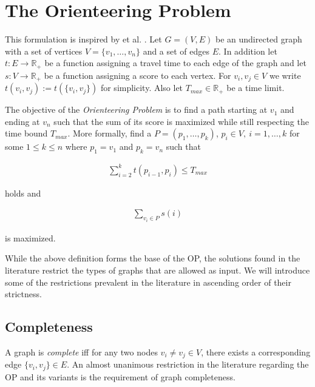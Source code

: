 \section{The Orienteering Problem} %
\label{sec:02:problem}

This formulation is inspired by \citeauthor{vansteenwegen_orienteering_2011} et al. \cite{vansteenwegen_orienteering_2011}.
Let $G=(V,E)$ be an undirected graph with a set of vertices $V = \{v_1, \dots, v_n\}$ and a set of edges $E$.
In addition let $t: E \rightarrow \mathbb{R}_+$ be a function assigning a travel time to each edge of the graph and let
$s: V \rightarrow \mathbb{R}_+$ be a function assigning a score to each vertex.
For $v_i, v_j \in V$ we write $t(v_i, v_j) := t(\{v_i, v_j\})$ for simplicity.
Also let $T_{max} \in \mathbb{R}_+$ be a time limit.

The objective of the \emph{Orienteering Problem} is to find a path starting at $v_1$ and ending at $v_n$ 
such that the sum of its score is maximized while still respecting the time bound $T_{max}$.
More formally, find a $P = (p_1, \dots, p_k)$, $p_i \in V,\ i=1,\dots, k$ for some $1 \leq k \leq n$ where $p_1 = v_1$ and $p_k = v_n$ such that

\begin{align*}
  \sum_{i = 2}^k t(p_{i-1}, p_i) \leq T_{max}
\end{align*}

holds and

\begin{align*}
  \sum_{v_i \in P} s(i)
\end{align*}

is maximized.


While the above definition forms the base of the OP, the solutions found in the literature restrict the types of graphs that are allowed as input.
We will introduce some of the restrictions prevalent in the literature in ascending order of their strictness. 

\subsection{Completeness}
\label{subsec:02:complete}

A graph is \emph{complete} iff for any two nodes $v_i \neq v_j \in V$, there exists a corresponding edge $\{v_i, v_j\} \in E$.
An almost unanimous \cite{vansteenwegen_orienteering_2011} restriction in the literature regarding the OP and its variants is the requirement of graph completeness. \cite{szwarc_novel_2022,vansteenwegen_orienteering_2011,laporte_selective_1990,santini_hazardous_2022}

